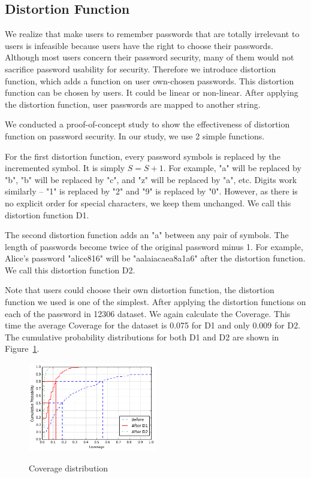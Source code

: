 \documentclass{sig-alternate}
\begin{document}
\subsection{Distortion Function}
We realize that make users to remember passwords that are totally irrelevant to users is infeasible because users have the right to choose their passwords. Although most users concern their password security, many of them would not sacrifice password usability for security. Therefore we introduce distortion function, which adds a function on user own-chosen passwords. This distortion function can be chosen by users. It could be linear or non-linear. After applying the distortion function, user passwords are mapped to another string. 

We conducted a proof-of-concept study to show the effectiveness of distortion function on password security. In our study, we use 2 simple functions. 

For the first distortion function, every password symbols is replaced by the incremented symbol. It is simply $S = S + 1$. For example, "a" will be replaced by "b", "b" will be replaced by "c", and "z" will be replaced by "a", etc. Digits work similarly -- "1" is replaced by "2" and "9" is replaced by "0". However, as there is no explicit order for special characters, we keep them unchanged. We call this distortion function D1.

The second distortion function adds an "a" between any pair of symbols. The length of passwords become twice of the original password minus 1. For example, Alice's password "alice816" will be "aalaiacaea8a1a6" after the distortion function. We call this distortion function D2.

Note that users could choose their own distortion function, the distortion function we used is one of the simplest. After applying the distortion functions on each of the password in 12306 dataset. We again calculate the Coverage. This time the average Coverage for the dataset is 0.075 for D1 and only 0.009 for D2. The cumulative probability distributions for both D1 and D2 are shown in Figure~\ref{f4}. 
\begin{figure}[h!]
\centering
  \caption{Coverage distribution}{}
  \label{f4}
  \centering
    \includegraphics[width=0.5\textwidth]{fig/dist1}
\end{figure}
\end{document}
